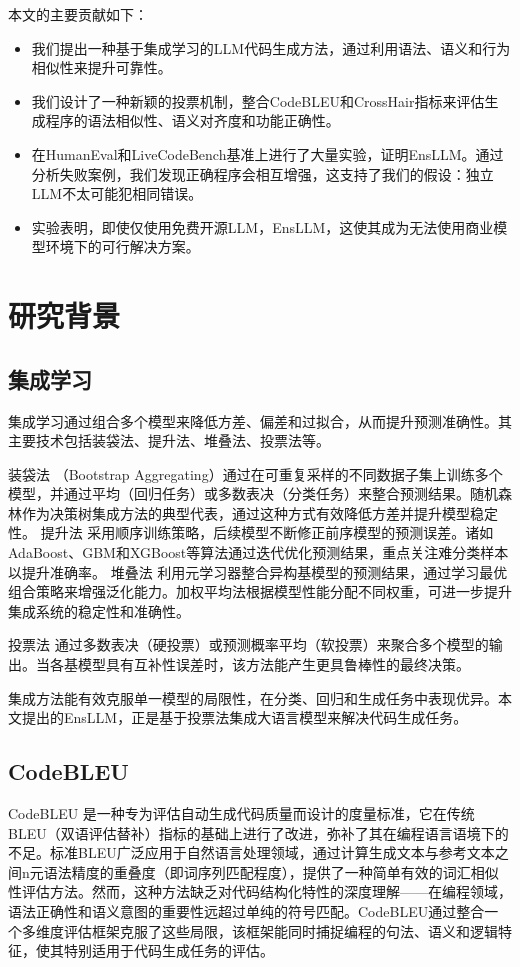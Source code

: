 \documentclass{article}
\newcommand{\tool}{EnsLLM}
\begin{document}
本文的主要贡献如下：
\begin{itemize}
    \item 我们提出一种基于集成学习的LLM代码生成方法，通过利用语法、语义和行为相似性来提升可靠性。
    \item 我们设计了一种新颖的投票机制，整合CodeBLEU和CrossHair指标来评估生成程序的语法相似性、语义对齐度和功能正确性。
    \item 在HumanEval和LiveCodeBench基准上进行了大量实验，证明\tool{}。通过分析失败案例，我们发现正确程序会相互增强，这支持了我们的假设：独立LLM不太可能犯相同错误。
    \item 实验表明，即使仅使用免费开源LLM，\tool{}，这使其成为无法使用商业模型环境下的可行解决方案。
\end{itemize}
\section{研究背景}


\subsection{集成学习}
集成学习通过组合多个模型来降低方差、偏差和过拟合，从而提升预测准确性。其主要技术包括装袋法、提升法、堆叠法、投票法等。

装袋法 \cite{bagging}（Bootstrap Aggregating）通过在可重复采样的不同数据子集上训练多个模型，并通过平均（回归任务）或多数表决（分类任务）来整合预测结果。随机森林作为决策树集成方法的典型代表，通过这种方式有效降低方差并提升模型稳定性。
提升法 \cite{boosting} 采用顺序训练策略，后续模型不断修正前序模型的预测误差。诸如AdaBoost、GBM和XGBoost等算法通过迭代优化预测结果，重点关注难分类样本以提升准确率。
堆叠法 \cite{stacking} 利用元学习器整合异构基模型的预测结果，通过学习最优组合策略来增强泛化能力。加权平均法根据模型性能分配不同权重，可进一步提升集成系统的稳定性和准确性。

投票法 \cite{kittler1998combining} 通过多数表决（硬投票）或预测概率平均（软投票）来聚合多个模型的输出。当各基模型具有互补性误差时，该方法能产生更具鲁棒性的最终决策。

集成方法能有效克服单一模型的局限性，在分类、回归和生成任务中表现优异。本文提出的\tool{}，正是基于投票法集成大语言模型来解决代码生成任务。
\subsection{CodeBLEU}
CodeBLEU \cite{codebleu} 是一种专为评估自动生成代码质量而设计的度量标准，它在传统BLEU（双语评估替补）指标的基础上进行了改进，弥补了其在编程语言语境下的不足。标准BLEU广泛应用于自然语言处理领域，通过计算生成文本与参考文本之间n元语法精度的重叠度（即词序列匹配程度），提供了一种简单有效的词汇相似性评估方法。然而，这种方法缺乏对代码结构化特性的深度理解——在编程领域，语法正确性和语义意图的重要性远超过单纯的符号匹配。CodeBLEU通过整合一个多维度评估框架克服了这些局限，该框架能同时捕捉编程的句法、语义和逻辑特征，使其特别适用于代码生成任务的评估。
\end{document}
